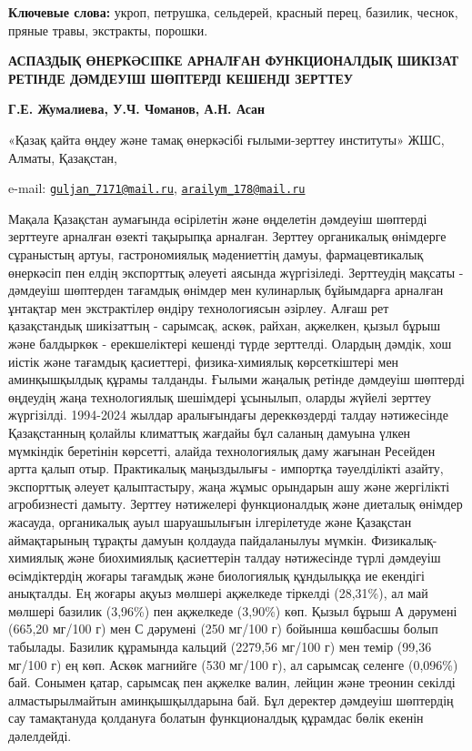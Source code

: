 {\bfseries Ключевые слова:} укроп, петрушка, сельдерей, красный перец,
базилик, чеснок, пряные травы, экстракты, порошки.

\begin{articleheader}
{\bfseries АСПАЗДЫҚ ӨНЕРКӘСІПКЕ АРНАЛҒАН ФУНКЦИОНАЛДЫҚ ШИКІЗАТ РЕТІНДЕ
ДӘМДЕУІШ ШӨПТЕРДІ КЕШЕНДІ ЗЕРТТЕУ}

{\bfseries
Г.Е. Жумалиева\textsuperscript{\envelope },
У.Ч. Чоманов,
А.Н. Асан\textsuperscript{\envelope }
}
\end{articleheader}

\begin{affiliation}
«Қазақ қайта өңдеу және тамақ өнеркәсібі ғылыми-зерттеу институты» ЖШС,
Алматы, Қазақстан,

e-mail:
\href{mailto:guljan\_7171@mail.ru}{\nolinkurl{guljan\_7171@mail.ru}},
\href{mailto:arailym\_178@mail.ru}{\nolinkurl{arailym\_178@mail.ru}}
\end{affiliation}

Мақала Қазақстан аумағында өсірілетін және өңделетін дәмдеуіш шөптерді
зерттеуге арналған өзекті тақырыпқа арналған. Зерттеу органикалық
өнімдерге сұраныстың артуы, гастрономиялық мәдениеттің дамуы,
фармацевтикалық өнеркәсіп пен елдің экспорттық әлеуеті аясында
жүргізіледі. Зерттеудің мақсаты - дәмдеуіш шөптерден тағамдық өнімдер
мен кулинарлық бұйымдарға арналған ұнтақтар мен экстрактілер өндіру
технологиясын әзірлеу. Алғаш рет қазақстандық шикізаттың - сарымсақ,
аскөк, райхан, ақжелкен, қызыл бұрыш және балдыркөк - ерекшеліктері
кешенді түрде зерттелді. Олардың дәмдік, хош иістік және тағамдық
қасиеттері, физика-химиялық көрсеткіштері мен аминқышқылдық құрамы
талданды. Ғылыми жаңалық ретінде дәмдеуіш шөптерді өңдеудің жаңа
технологиялық шешімдері ұсынылып, оларды жүйелі зерттеу жүргізілді.
1994-2024 жылдар аралығындағы дереккөздерді талдау нәтижесінде
Қазақстанның қолайлы климаттық жағдайы бұл саланың дамуына үлкен
мүмкіндік беретінін көрсетті, алайда технологиялық даму жағынан Ресейден
артта қалып отыр. Практикалық маңыздылығы - импортқа тәуелділікті
азайту, экспорттық әлеует қалыптастыру, жаңа жұмыс орындарын ашу және
жергілікті агробизнесті дамыту. Зерттеу нәтижелері функционалдық және
диеталық өнімдер жасауда, органикалық ауыл шаруашылығын ілгерілетуде
және Қазақстан аймақтарының тұрақты дамуын қолдауда пайдаланылуы мүмкін.
Физикалық-химиялық және биохимиялық қасиеттерін талдау нәтижесінде түрлі
дәмдеуіш өсімдіктердің жоғары тағамдық және биологиялық құндылыққа ие
екендігі анықталды. Ең жоғары ақуыз мөлшері ақжелкеде тіркелді
(28,31\%), ал май мөлшері базилик (3,96\%) пен ақжелкеде (3,90\%) көп.
Қызыл бұрыш А дәрумені (665,20 мг/100 г) мен С дәрумені (250 мг/100 г)
бойынша көшбасшы болып табылады. Базилик құрамында кальций (2279,56
мг/100 г) мен темір (99,36 мг/100 г) ең көп. Аскөк магнийге (530 мг/100
г), ал сарымсақ селенге (0,096\%) бай. Сонымен қатар, сарымсақ пен
ақжелке валин, лейцин және треонин секілді алмастырылмайтын
аминқышқылдарына бай. Бұл деректер дәмдеуіш шөптердің сау тамақтануда
қолдануға болатын функционалдық құрамдас бөлік екенін дәлелдейді.

